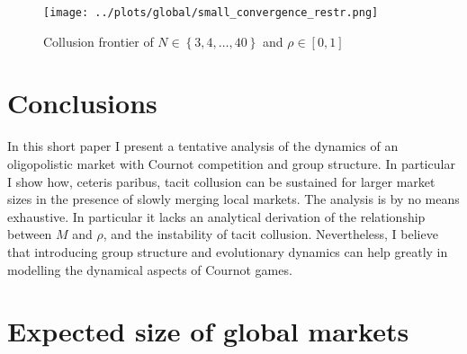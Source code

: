 \documentclass[american]{scrartcl}
\newcommand{\set}[1]{\left\{#1\right\}}
\begin{document}
\begin{figure}[H]
    \center
    \texttt{[image: ../plots/global/small\_convergence\_restr.png]}
    \caption{Collusion frontier of $N \in \set{3, 4, \ldots, 40}$ and $\rho \in [0, 1]$ }
    \label{fig:frontier}
\end{figure}

\section{Conclusions}

In this short paper I present a tentative analysis of the dynamics of an oligopolistic market with Cournot competition and group structure. In particular I show how, ceteris paribus, tacit collusion can be sustained for larger market sizes in the presence of slowly merging local markets. The analysis is by no means exhaustive. In particular it lacks an analytical derivation of the relationship between $M$ and $\rho$, and the instability of tacit collusion. Nevertheless, I believe that introducing group structure and evolutionary dynamics can help greatly in modelling the dynamical aspects of Cournot games.

\newpage
\nocite{*}
\printbibliography

\newpage
\appendix

\section{Expected size of global markets} \label{A:exp_size}
\end{document}
